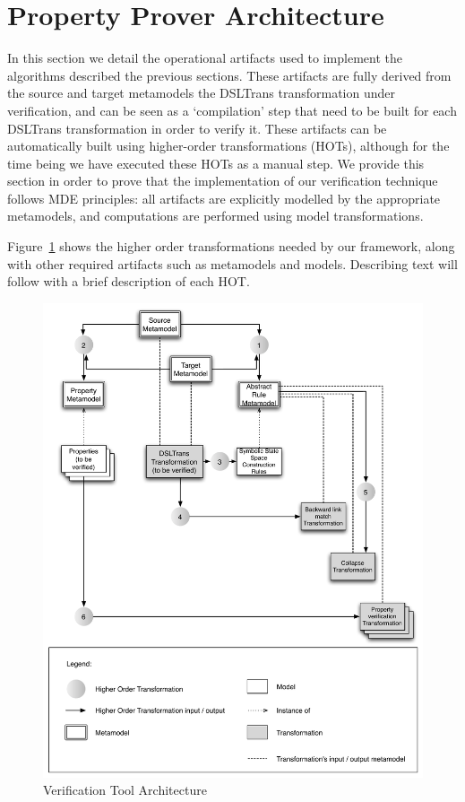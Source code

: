 \section{Property Prover Architecture}
\label{sec:architecture}

In this section we detail the operational artifacts used to implement the
algorithms described the previous sections. These artifacts are fully derived
from the source and target metamodels the DSLTrans transformation under
verification, and can be seen as a `compilation' step that need to be built for
each DSLTrans transformation in order to verify it. These artifacts can be
automatically built using higher-order transformations (HOTs), although for the
time being we have executed these HOTs as a manual step. We provide this section
in order to prove that the implementation of our verification technique follows
MDE principles: all artifacts are explicitly modelled by the appropriate
metamodels, and computations are performed using model transformations.

Figure~\ref{fig:verif_tool_arch} shows the higher order transformations needed
by our framework, along with other required artifacts such as metamodels and
models. Describing text will follow with a brief description of each HOT.

\begin{figure}[h!] \centering \includegraphics[scale=.45]{./figures/dsltrans_verification_architecture.pdf}
	\caption{Verification Tool Architecture}
	\label{fig:verif_tool_arch}
\end{figure}

